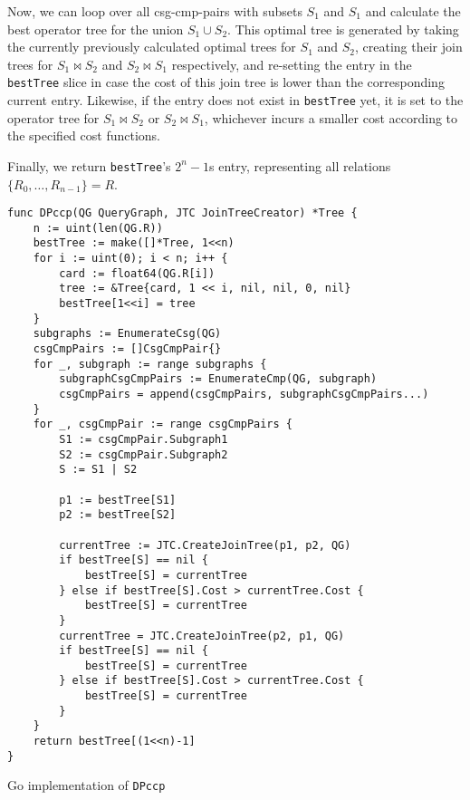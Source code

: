 Now, we can loop over all csg-cmp-pairs with subsets $S_1$ and $S_1$ and calculate the best operator tree for the union $S_1 \cup S_2$. This optimal tree is generated by taking the currently previously calculated optimal trees for $S_1$ and $S_2$, creating their join trees for $S_1 \Join S_2$ and $S_2 \Join S_1$ respectively, and re-setting the entry in the \texttt{bestTree} slice in case the cost of this join tree is lower than the corresponding current entry. Likewise, if the entry does not exist in \texttt{bestTree} yet, it is set to the operator tree for $S_1 \Join S_2$ or $S_2 \Join S_1$, whichever incurs a smaller cost according to the specified cost functions.

Finally, we return \texttt{bestTree}'s $2^{n}-1$s entry, representing all relations $\{R_0,\ldots,R_{n-1}\} = R$.

\newpage

\begin{algorithm}[H]
\begin{verbatim}
func DPccp(QG QueryGraph, JTC JoinTreeCreator) *Tree {
    n := uint(len(QG.R))
    bestTree := make([]*Tree, 1<<n)
    for i := uint(0); i < n; i++ {
        card := float64(QG.R[i])
        tree := &Tree{card, 1 << i, nil, nil, 0, nil}
        bestTree[1<<i] = tree
    }
    subgraphs := EnumerateCsg(QG)
    csgCmpPairs := []CsgCmpPair{}
    for _, subgraph := range subgraphs {
        subgraphCsgCmpPairs := EnumerateCmp(QG, subgraph)
        csgCmpPairs = append(csgCmpPairs, subgraphCsgCmpPairs...)
    }
    for _, csgCmpPair := range csgCmpPairs {
        S1 := csgCmpPair.Subgraph1
        S2 := csgCmpPair.Subgraph2
        S := S1 | S2

        p1 := bestTree[S1]
        p2 := bestTree[S2]

        currentTree := JTC.CreateJoinTree(p1, p2, QG)
        if bestTree[S] == nil {
            bestTree[S] = currentTree
        } else if bestTree[S].Cost > currentTree.Cost {
            bestTree[S] = currentTree
        }
        currentTree = JTC.CreateJoinTree(p2, p1, QG)
        if bestTree[S] == nil {
            bestTree[S] = currentTree
        } else if bestTree[S].Cost > currentTree.Cost {
            bestTree[S] = currentTree
        }
    }
    return bestTree[(1<<n)-1]
}
\end{verbatim}
\caption{Go implementation of \texttt{DPccp}}
\label{alg:dpccp}
\end{algorithm}





